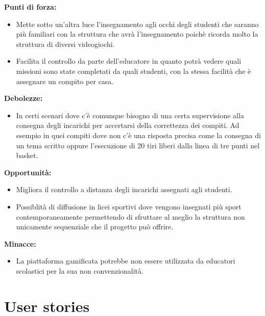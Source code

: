 \textbf{Punti di forza:}
\begin{itemize}
  \item Mette sotto un'altra luce l'insegnamento agli occhi degli studenti che saranno più familiari con la struttura che avrà l'insegnamento poichè ricorda molto la struttura di diversi videogiochi.

  \item Facilita il controllo da parte dell'educatore in quanto potrà vedere quali missioni sono state completati da quali studenti, con la stessa facilità che è assegnare un compito per casa.
\end{itemize}

\textbf{Debolezze:}
\begin{itemize}
  \item In certi scenari dove c'è comunque bisogno di una certa supervisione alla consegna degli incarichi per accertarsi della correttezza dei compiti. Ad esempio in quei compiti dove non c'è una risposta precisa come la consegna di un tema scritto oppure l'esecuzione di 20 tiri liberi dalla linea di tre punti nel basket.


\end{itemize}

\textbf{Opportunità:}
\begin{itemize}
  \item Migliora il controllo a distanza degli incarichi assegnati agli studenti.

  \item Possiblità di diffusione in licei sportivi dove vengono insegnati più sport contemporaneamente permettendo di sfruttare al meglio la struttura non unicamente sequenziale che il progetto può offrire.
\end{itemize}

\textbf{Minacce:}
\begin{itemize}
  \item La piattaforma gamificata potrebbe non essere utilizzata da educatori scolastici per la sua non convenzionalità.
\end{itemize}

\section{User stories}

